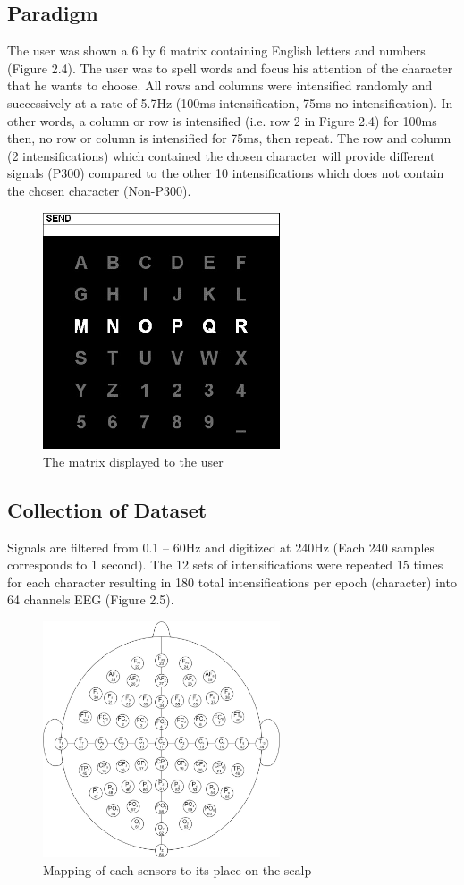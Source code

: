 \subsection{Paradigm}
The user was shown a 6 by 6 matrix containing English letters and numbers (Figure 2.4). The user was to spell words and focus his attention of the character that he wants to choose. All rows and columns were intensified randomly and successively at a rate of 5.7Hz (100ms intensification, 75ms no intensification). In other words, a column or row is intensified (i.e. row 2 in Figure 2.4) for 100ms then, no row or column is intensified for 75ms, then repeat. The row and column (2 intensifications) which contained the chosen character will provide different signals (P300) compared to the other 10 intensifications which does not contain the chosen character (Non-P300).
\begin{figure}
    \centering
    \includegraphics[width=70mm]{images/figure-2-4.jpg}
    \caption{The matrix displayed to the user}
    \label{fig:my_label}
\end{figure}

\subsection{Collection of Dataset}
Signals are filtered from 0.1 – 60Hz and digitized at 240Hz (Each 240 samples corresponds to 1 second). The 12 sets of intensifications were repeated 15 times for each character resulting in 180 total intensifications per epoch (character) into 64 channels EEG (Figure 2.5).
\begin{figure}
    \centering
    \includegraphics[width=70mm]{images/figure-2-5.jpg}
    \caption{Mapping of each sensors to its place on the scalp}
    \label{fig:my_label}
\end{figure}

